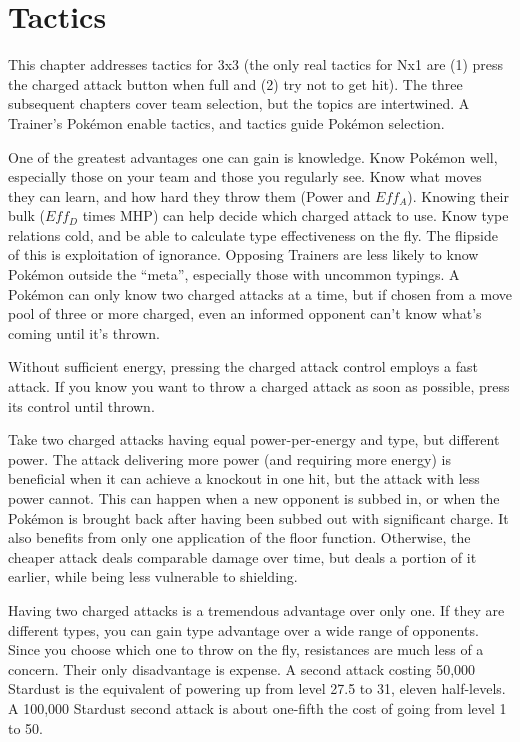 \chapter{Tactics\label{chap:strategy}}
This chapter addresses tactics for 3x3 (the only real tactics for Nx1 are (1)
  press the charged attack button when full and (2) try not to get hit).
The three subsequent chapters cover team selection, but the topics are intertwined.
A Trainer's Pokémon enable tactics, and tactics guide Pokémon selection.

One of the greatest advantages one can gain is knowledge.
Know Pokémon well, especially those on your team and those you regularly see.
Know what moves they can learn, and how hard they throw them (Power and $Eff_A$).
Knowing their bulk ($Eff_D$ times MHP) can help decide which charged attack to use.
Know type relations cold, and be able to calculate type effectiveness on the fly.
The flipside of this is exploitation of ignorance.
Opposing Trainers are less likely to know Pokémon outside the ``meta'',
 especially those with uncommon typings.
A Pokémon can only know two charged attacks at a time, but if
 chosen from a move pool of three or more charged, even an informed opponent
 can't know what's coming until it's thrown.

\begin{tipbox}[title=A tip regarding battle UI]
Without sufficient energy, pressing the charged attack control employs a fast attack.
If you know you want to throw a charged attack as soon as possible, press its control until thrown.
\end{tipbox}

Take two charged attacks having equal power-per-energy and type, but different power.
The attack delivering more power (and requiring more energy) is beneficial
 when it can achieve a knockout in one hit, but the attack with less power cannot.
This can happen when a new opponent is subbed in, or when the Pokémon is brought back
 after having been subbed out with significant charge.
It also benefits from only one application of the floor function.
Otherwise, the cheaper attack deals comparable damage over time, but deals a portion
 of it earlier, while being less vulnerable to shielding.

Having two charged attacks is a tremendous advantage over only one.
If they are different types, you can gain type advantage over a wide range of opponents.
Since you choose which one to throw on the fly, resistances are much less of a concern.
Their only disadvantage is expense.
A second attack costing 50,000 Stardust is the equivalent of powering up from level 27.5 to 31,
 eleven half-levels.
A 100,000 Stardust second attack is about one-fifth the cost of going from level 1 to 50.

